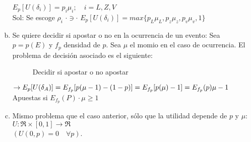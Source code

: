 \begin{enumerate}[(a)]
  $E_p[U(\delta_i)]=p_i\mu_i;\quad i=L,Z,V$\\
  
  Sol: Se escoge $\rho_i \,\, \cdot \ni \cdot \,\, E_p[U(\delta_i)]=max\{p_L\mu_L,p_z\mu_z,p_v\mu_v,1\}$
  
  \item Se quiere decidir si apostar o no en la ocurrencia de un evento: Sea $p=p(E)$ y $f_p$ densidad de $p$. Sea $\mu$ el momio en el caso de ocurrencia. El problema de decisión asociado es el siguiente:\\
 
\begin{figure}[!ht]
\caption{Decidir si apostar o no apostar}
\end{figure}
 
\newpage
  
  $\rightarrow E_p[U(\delta_A)]=E_{f_p}[p(\mu-1)-(1-p)]\\
  =E_{f_p}[p(\mu)-1]\\
  =E_{f_p}(p)\mu-1$\\

  Apuestas si $E_{f_p}(P)\cdot \mu \ge 1$
  
  \item Mismo problema que el caso anterior, sólo que la utilidad depende de $p$ y $\mu$: $U: \Re\times[0,1]\rightarrow\Re$\\
  $(U(0,p)=0\quad\forall p)$.\\
 

\end{enumerate}
